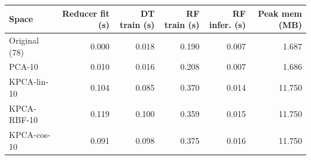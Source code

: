 \begin{tabular}{lrrrrr}
\toprule
Space & Reducer fit (s) & DT train (s) & RF train (s) & RF infer. (s) & Peak mem (MB) \\
\midrule
Original (78) & 0.000 & 0.018 & 0.190 & 0.007 & 1.687 \\
PCA-10 & 0.010 & 0.016 & 0.208 & 0.007 & 1.686 \\
KPCA-lin-10 & 0.104 & 0.085 & 0.370 & 0.014 & 11.750 \\
KPCA-RBF-10 & 0.119 & 0.100 & 0.359 & 0.015 & 11.750 \\
KPCA-cos-10 & 0.091 & 0.098 & 0.375 & 0.016 & 11.750 \\
\bottomrule
\end{tabular}
